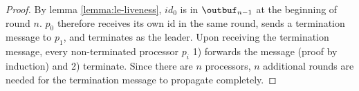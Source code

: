 \begin{proof}
By lemma \ref{lemma:le-liveness}, $id_0$ is in $\outbuf_{n-1}$ at the beginning of round $n$.
$p_0$ therefore receives its own id in the same round, sends a termination message to $p_1$,
and terminates as the leader. Upon receiving the termination message, every non-terminated
processor $p_i$ 1) forwards the message (proof by induction) and 2) terminate. Since there are
$n$ processors, $n$ additional rounds are needed for the termination message to propagate completely.
\end{proof}

